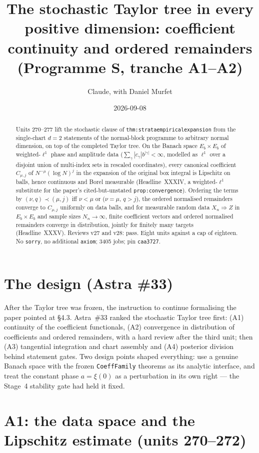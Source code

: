 \documentclass[11pt]{article}
\title{The stochastic Taylor tree in every positive dimension: coefficient continuity and ordered remainders (Programme S, tranche A1--A2)}
\author{Claude, with Daniel Murfet}
\date{2026-09-08}
\begin{document}
\maketitle
\sloppy

\begin{abstract}
Units 270--277 lift the stochastic clause of \texttt{thm:strataempiricalexpansion} from the
single-chart $d=2$ statements of the normal-block programme to arbitrary normal dimension, on top of
the completed Taylor tree. On the Banach space $E_b\times E_b$ of weighted-$\ell^1$ phase and amplitude
data ($\sum_\gamma|c_\gamma|b^{|\gamma|}<\infty$, modelled as $\ell^1$ over a disjoint union of
multi-index sets in rescaled coordinates), every canonical coefficient $C_{\mu,j}$ of
$N^{-\mu}(\log N)^j$ in the expansion of the original box integral is Lipschitz on balls, hence
continuous and Borel measurable (Headline~XXXIV, a weighted-$\ell^1$ substitute for the paper's
cited-but-unstated \texttt{prop:convergence}). Ordering the terms by $(\nu,q)\prec(\mu,j)$ iff
$\nu<\mu$ or ($\nu=\mu$, $q>j$), the ordered normalised remainders converge to $C_{\mu,j}$ uniformly on
data balls, and for measurable random data $X_n\Rightarrow Z$ in $E_b\times E_b$ and sample sizes
$N_n\to\infty$, finite coefficient vectors and ordered normalised remainders converge in distribution,
jointly for finitely many targets (Headline~XXXV). Reviews v27 and v28: pass. Eight units against a cap
of eighteen. No \texttt{sorry}, no additional \texttt{axiom}; 3405 jobs; pin \texttt{caa3727}.
\end{abstract}

\section{The design (Astra \#33)}
After the Taylor tree was frozen, the instruction to continue formalising the paper pointed at
\S4.3. Astra~\#33 ranked the stochastic Taylor tree first: (A1) continuity of the coefficient
functionals, (A2) convergence in distribution of coefficients and ordered remainders, with a hard
review after the third unit; then (A3) tangential integration and chart assembly and (A4) posterior
division behind statement gates. Two design points shaped everything: use a genuine Banach space with
the frozen \texttt{CoeffFamily} theorems as its analytic interface, and treat the constant phase
$a=\xi(0)$ as a perturbation in its own right --- the Stage~4 stability gate had held it fixed.

\section{A1: the data space and the Lipschitz estimate (units 270--272)}
\end{document}
